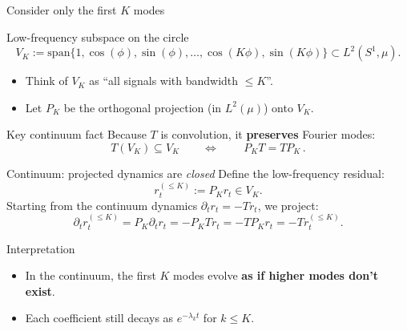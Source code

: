 \documentclass[10pt,aspectratio=169]{beamer}
\begin{document}
\begin{frame}{Consider only the first $K$ modes}
	\small
	\begin{block}{Low-frequency subspace on the circle}
		\[
			V_K := \mathrm{span}\{1,\cos(\phi),\sin(\phi),\dots,\cos(K\phi),\sin(K\phi)\}\subset L^2(S^1,\mu).
		\]
		\begin{itemize}
			\item Think of $V_K$ as ``all signals with bandwidth $\le K$''.
			\item Let $P_K$ be the orthogonal projection (in $L^2(\mu)$) onto $V_K$.
		\end{itemize}
	\end{block}

	\begin{block}{Key continuum fact}
		Because $T$ is convolution, it \textbf{preserves} Fourier modes:
		\[
			T(V_K)\subseteq V_K
			\qquad\Longleftrightarrow\qquad
			\boxed{\,P_K T = T P_K\,}.
		\]
	\end{block}

\end{frame}

\begin{frame}{Continuum: projected dynamics are \emph{closed}}
	\small
	Define the low-frequency residual:
	\[
		r_t^{(\le K)} := P_K r_t \in V_K.
	\]
	Starting from the continuum dynamics $\partial_t r_t = -T r_t$, we project:
	\[
		\partial_t r_t^{(\le K)}
		= P_K \partial_t r_t
		= -P_K T r_t
		= -T P_K r_t
		= -T r_t^{(\le K)}.
	\]
	\begin{block}{Interpretation}
		\begin{itemize}
			\item In the continuum, the first $K$ modes evolve \textbf{as if higher modes don't exist}.
			\item Each coefficient still decays as $e^{-\lambda_k t}$ for $k\le K$.
		\end{itemize}
	\end{block}

\end{frame}
\end{document}
